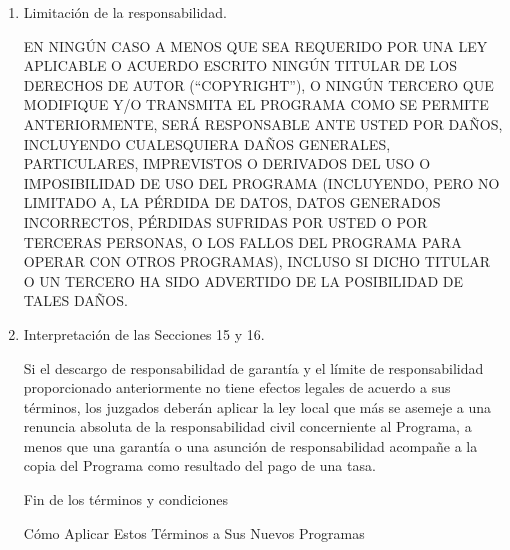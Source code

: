 {\begin{enumerate}
\begin{sloppypar}
 NO HAY GARANT\'{I}A PARA EL PROGRAMA, PARA LA EXTENSI\'{O}N PERMITIDA POR LA LEY 
APLICABLE. EXCEPTO CUANDO SE INDIQUE LO CONTRARIO POR ESCRITO, LOS TITULARES 
DE LOS DERECHOS DE AUTOR (``COPYRIGHT'') Y/O TERCEROS PROPORCIONAN EL PROGRAMA 
``TAL CUAL'' SIN GARANT\'{I}AS DE NING\'{U}N TIPO, BIEN SEAN EXPL\'{I}CITAS O IMPL\'{I}CITAS, 
INCLUYENDO, PERO NO LIMITADO A, LAS GARANT\'{I}AS IMPL\'{I}CITAS DE COMERCIALIZACI\'{O}N 
Y APTITUD PARA UN PROP\'{O}SITO PARTICULAR. EL RIESGO TOTAL EN CUANTO A CALIDAD 
Y RENDIMIENTO DEL PROGRAMA ES CON USTED. SI EL PROGRAMA PRESENTA ALG\'{U}N 
DEFECTO, USTED ASUME EL COSTO DE TODAS LAS REVISIONES NECESARIAS, 
REPARACIONES O CORRECCIONES.
\end{sloppypar}

\item Limitaci\'{o}n de la responsabilidad.

 EN NING\'{U}N CASO A MENOS QUE SEA REQUERIDO POR UNA LEY APLICABLE O ACUERDO ESCRITO NING\'{U}N TITULAR DE LOS DERECHOS DE AUTOR
(``COPYRIGHT''), O NING\'{U}N TERCERO QUE MODIFIQUE Y/O TRANSMITA EL PROGRAMA COMO SE PERMITE ANTERIORMENTE, SER\'{A} RESPONSABLE ANTE USTED POR DA\~NOS, INCLUYENDO CUALESQUIERA DA\~NOS GENERALES, PARTICULARES, IMPREVISTOS O DERIVADOS DEL USO O IMPOSIBILIDAD DE USO DEL PROGRAMA
 (INCLUYENDO, PERO NO LIMITADO A, LA P\'{E}RDIDA DE DATOS, DATOS GENERADOS INCORRECTOS, P\'{E}RDIDAS SUFRIDAS POR USTED O POR TERCERAS PERSONAS, O LOS FALLOS DEL PROGRAMA PARA OPERAR CON OTROS PROGRAMAS), INCLUSO SI DICHO TITULAR O UN TERCERO HA SIDO ADVERTIDO DE LA POSIBILIDAD DE TALES DA\~NOS.

\item Interpretaci\'{o}n de las Secciones 15 y 16.

Si el descargo de responsabilidad de garant\'{i}a y el l\'{i}mite de responsabilidad 
proporcionado anteriormente no tiene efectos legales de acuerdo a sus t\'{e}rminos, los juzgados deber\'{a}n aplicar la ley local que m\'{a}s se asemeje a una 
renuncia absoluta de la responsabilidad civil concerniente al Programa, a 
menos que una garant\'{i}a o una asunci\'{o}n de responsabilidad acompa\~ne a la copia 
del Programa como resultado del pago de una tasa.

\begin{center}
{\Large\sc Fin de los t\'{e}rminos y condiciones}

\bigskip
C\'{o}mo Aplicar Estos T\'{e}rminos a Sus Nuevos Programas
\end{center}


\end{enumerate}}
